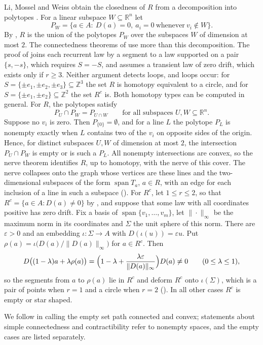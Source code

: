 \documentclass[11pt]{article}
\theoremstyle{remark}
\DeclareMathOperator{\spn}{span}
\newcommand{\R}{\mathbb{R}}
\newcommand{\Z}{\mathbb{Z}}
\begin{document}
Li, Mossel and Weiss obtain the closedness of $R$ from a decomposition into polytopes
\cite[proof of Theorem~6.2]{LMW}. For a linear subspace $W\subseteq\R^n$ let
\[
P_W=\{a\in A:\ D(a)=0,\ a_i=0\ \text{whenever}\ v_i\notin W\}.
\]
By , $R$ is the union of the polytopes $P_W$ over the subspaces $W$ of dimension at most $2$. The
connectedness theorems of \cite{LMW} use more than this decomposition. The proof of \cite[Theorem~6.3]{LMW} joins each
recurrent law by a segment to a law supported on a pair $\{s,-s\}$, which requires $S=-S$, and
\cite[Theorem~6.9]{LMW} assumes a transient law of zero drift, which exists only if $r\ge 3$. Neither argument
detects loops, and loops occur: for $S=\{\pm e_1,\pm e_2,\pm e_3\}\subseteq\Z^3$ the set $R$ is homotopy equivalent
to a circle, and for $S=\{\pm e_1,\pm e_2\}\subseteq\Z^2$ the set $R^c$ is. Both homotopy types can be computed in
general. For $R$, the polytopes satisfy
\[
P_U\cap P_W=P_{U\cap W}\qquad\text{for all subspaces } U,W\subseteq\R^n .
\]
Suppose no $v_i$ is zero. Then $P_{\{0\}}=\emptyset$, and for a line $L$ the polytope $P_L$ is nonempty exactly when
$L$ contains two of the $v_i$ on opposite sides of the origin. Hence, for distinct subspaces $U,W$ of dimension at
most $2$, the intersection $P_U\cap P_W$ is empty or is such a $P_L$. All nonempty intersections are convex, so the
nerve theorem \cite{Bjorner2003} identifies $R$, up to homotopy, with the nerve of this cover. The nerve
collapses onto the graph whose vertices are these lines and the two-dimensional subspaces of the form $\spn T_a$,
$a\in R$, with an edge for each inclusion of a line in such a subspace (). For $R^c$, let $1\le r\le 2$, so that
$R^c=\{a\in A: D(a)\neq 0\}$ by , and suppose that some law with all coordinates positive has zero
drift. Fix a basis of $\spn\{v_1,\dots,v_m\}$, let $\|\cdot\|_\infty$ be the maximum norm in its coordinates and
$\Sigma$ the unit sphere of this norm. There are $\varepsilon>0$ and an embedding $\iota\colon\Sigma\to A$ with
$D(\iota(u))=\varepsilon u$. Put $\rho(a)=\iota\bigl(D(a)/\|D(a)\|_\infty\bigr)$ for $a\in R^c$. Then
\[
D\bigl((1-\lambda)a+\lambda\rho(a)\bigr)=\Bigl(1-\lambda+\frac{\lambda\varepsilon}{\|D(a)\|_\infty}\Bigr)D(a)\neq 0
\qquad(0\le\lambda\le 1),
\]
so the segments from $a$ to $\rho(a)$ lie in $R^c$ and deform $R^c$ onto $\iota(\Sigma)$, which is a pair of points when
$r=1$ and a circle when $r=2$ (). In all other cases $R^c$ is empty or star shaped.

We follow \cite{LMW} in
calling the empty set path connected and convex; statements about simple connectedness and contractibility refer to
nonempty spaces, and the empty cases are listed separately.
\end{document}

